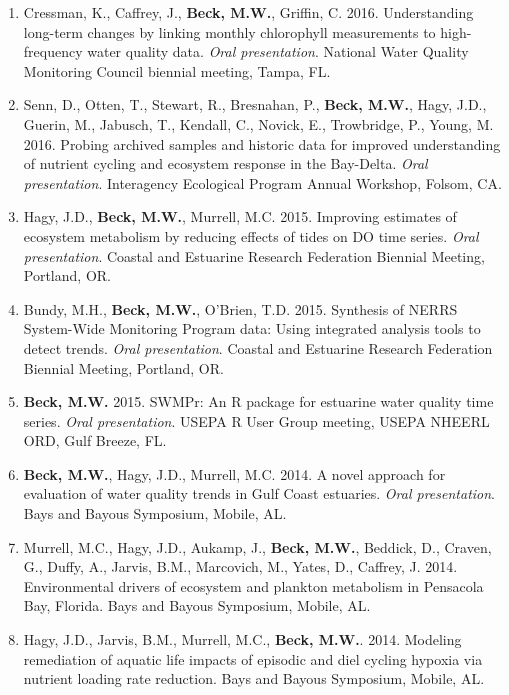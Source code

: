 \documentclass[letterpaper,12pt]{article}
\begin{document}
\begin{enumerate}
\item Cressman, K., Caffrey, J., {\bf Beck, M.W.}, Griffin, C. 2016. Understanding long-term changes by linking monthly chlorophyll measurements to high-frequency water quality data. \textit{Oral presentation}. National Water Quality Monitoring Council biennial meeting, Tampa, FL.

\item Senn, D., Otten, T., Stewart, R., Bresnahan, P., {\bf Beck, M.W.}, Hagy, J.D., Guerin, M., Jabusch, T., Kendall, C., Novick, E., Trowbridge, P., Young, M. 2016. Probing archived samples and historic data for improved understanding of nutrient cycling and ecosystem response in the Bay-Delta. \textit{Oral presentation}. Interagency Ecological Program Annual Workshop, Folsom, CA.

\item Hagy, J.D., {\bf Beck, M.W.}, Murrell, M.C. 2015. Improving estimates of ecosystem metabolism by reducing effects of tides on DO time series. \textit{Oral presentation}. Coastal and Estuarine Research Federation Biennial Meeting, Portland, OR. 

\item Bundy, M.H., {\bf Beck, M.W.}, O'Brien, T.D. 2015. Synthesis of NERRS System-Wide Monitoring Program data: Using integrated analysis tools to detect trends. \textit{Oral presentation}. Coastal and Estuarine Research Federation Biennial Meeting, Portland, OR.

\item {\bf Beck, M.W.} 2015. SWMPr: An R package for estuarine water quality time series. \textit{Oral presentation}. USEPA R User Group meeting, USEPA NHEERL ORD, Gulf Breeze, FL.

\item {\bf Beck, M.W.}, Hagy, J.D., Murrell, M.C. 2014. A novel approach for evaluation of water quality trends in Gulf Coast estuaries. \textit{Oral presentation}. Bays and Bayous Symposium, Mobile, AL.

\item Murrell, M.C., Hagy, J.D., Aukamp, J., {\bf Beck, M.W.}, Beddick, D., Craven, G., Duffy, A., Jarvis, B.M., Marcovich, M., Yates, D., Caffrey, J. 2014. Environmental drivers of ecosystem and plankton metabolism in Pensacola Bay, Florida. Bays and Bayous Symposium, Mobile, AL. 

\item Hagy, J.D., Jarvis, B.M., Murrell, M.C., {\bf Beck, M.W.}. 2014. Modeling remediation of aquatic life impacts of episodic and diel cycling hypoxia via nutrient loading rate reduction. Bays and Bayous Symposium, Mobile, AL. 


\end{enumerate}
\end{document}
